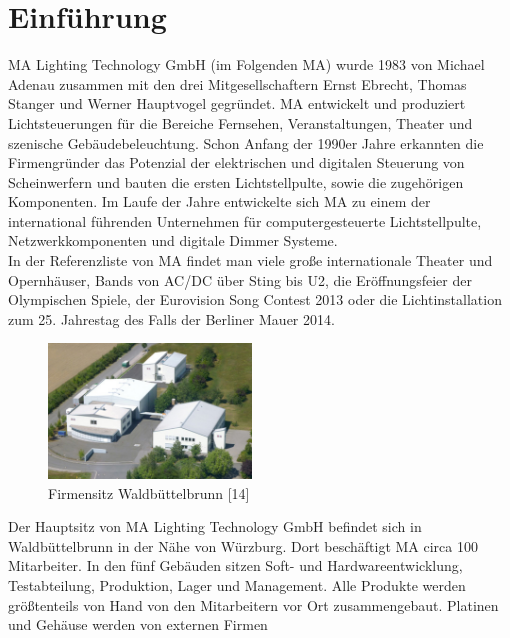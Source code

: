 \documentclass[11pt]{scrartcl}
\begin{document}
\section{Einführung}
MA Lighting Technology GmbH (im Folgenden MA) wurde 1983 von Michael Adenau zusammen mit
den drei Mitgesellschaftern Ernst Ebrecht, Thomas Stanger und Werner Hauptvogel gegründet. MA
entwickelt und produziert Lichtsteuerungen für die Bereiche Fernsehen, Veranstaltungen, Theater
und szenische Gebäudebeleuchtung. Schon Anfang der 1990er Jahre erkannten die Firmengründer
das Potenzial der elektrischen und digitalen Steuerung von Scheinwerfern und bauten die ersten
Lichtstellpulte, sowie die zugehörigen Komponenten. Im Laufe der Jahre entwickelte sich MA zu
einem der international führenden Unternehmen für computergesteuerte Lichtstellpulte,
Netzwerkkomponenten und digitale Dimmer Systeme.\\
In der Referenzliste von MA findet man viele große internationale Theater und Opernhäuser, Bands
von AC/DC über Sting bis U2, die Eröffnungsfeier der Olympischen Spiele, der Eurovision Song
Contest 2013 oder die Lichtinstallation zum 25. Jahrestag des Falls der Berliner Mauer 2014.\\
\begin{figure}
    \vspace{-20pt}
    \begin{center}
        \includegraphics[width=0.48\textwidth]{images/csm_MA_building_WBB.jpg}
    \end{center}
    \vspace{-20pt}
    \caption{Firmensitz Waldbüttelbrunn [14]}
    \vspace{-10pt}
\end{figure}
Der Hauptsitz von MA Lighting Technology GmbH
befindet sich in Waldbüttelbrunn in der Nähe von
Würzburg. Dort beschäftigt MA circa 100 Mitarbeiter. In
den fünf Gebäuden sitzen Soft- und Hardwareentwicklung,
Testabteilung, Produktion, Lager und
Management. Alle Produkte werden größtenteils von
Hand von den Mitarbeitern vor Ort zusammengebaut.
Platinen und Gehäuse werden von externen Firmen
\end{document}
